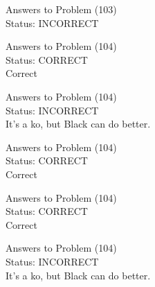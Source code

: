 \documentclass[11pt]{article}
\begin{document}
\begin{minipage}[t]{0.5\textwidth}
  {\centering
  
  Answers to Problem (103)\\
  Status: INCORRECT\\
  
  }
\end{minipage}
\begin{minipage}[t]{0.5\textwidth}
  {\centering
  
  Answers to Problem (104)\\
  Status: CORRECT\\
  Correct\\
  }
\end{minipage}
\begin{minipage}[t]{0.5\textwidth}
  {\centering
  
  Answers to Problem (104)\\
  Status: INCORRECT\\
  It's a ko, but Black can do better.\\
  }
\end{minipage}
\begin{minipage}[t]{0.5\textwidth}
  {\centering
  
  Answers to Problem (104)\\
  Status: CORRECT\\
  Correct\\
  }
\end{minipage}
\begin{minipage}[t]{0.5\textwidth}
  {\centering
  
  Answers to Problem (104)\\
  Status: CORRECT\\
  Correct\\
  }
\end{minipage}
\begin{minipage}[t]{0.5\textwidth}
  {\centering
  
  Answers to Problem (104)\\
  Status: INCORRECT\\
  It's a ko, but Black can do better.\\
  }
\end{minipage}
\end{document}
